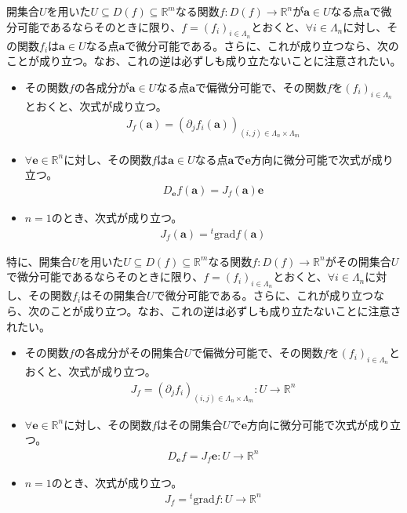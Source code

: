 \documentclass[dvipdfmx]{jsarticle}
\begin{document}
\begin{thm}\label{4.2.6.4}
開集合$U$を用いた$U \subseteq D(f) \subseteq \mathbb{R}^{m}$なる関数$f:D(f) \rightarrow \mathbb{R}^{n}$が$\mathbf{a} \in U$なる点$\mathbf{a}$で微分可能であるならそのときに限り、$f = \left( f_{i} \right)_{i \in \varLambda_{n}}$とおくと、$\forall i \in \varLambda_{n}$に対し、その関数$f_{i}$は$\mathbf{a} \in U$なる点$\mathbf{a}$で微分可能である。さらに、これが成り立つなら、次のことが成り立つ。なお、これの逆は必ずしも成り立たないことに注意されたい。
\begin{itemize}
\item
  その関数$f$の各成分が$\mathbf{a} \in U$なる点$\mathbf{a}$で偏微分可能で、その関数$f$を$\left( f_{i} \right)_{i \in \varLambda_{n}}$とおくと、次式が成り立つ。
\begin{align*}
J_{f}\left( \mathbf{a} \right) = \left( \partial_{j}f_{i}\left( \mathbf{a} \right) \right)_{(i,j) \in \varLambda_{n} \times \varLambda_{m}}
\end{align*}
\item
  $\forall\mathbf{e} \in \mathbb{R}^{n}$に対し、その関数$f$は$\mathbf{a} \in U$なる点$\mathbf{a}$で$\mathbf{e}$方向に微分可能で次式が成り立つ。
\begin{align*}
D_{\mathbf{e}}f\left( \mathbf{a} \right) = J_{f}\left( \mathbf{a} \right)\mathbf{e}
\end{align*}
\item
  $n = 1$のとき、次式が成り立つ。
\begin{align*}
J_{f}\left( \mathbf{a} \right) ={}^{t}\mathrm{grad}f\left( \mathbf{a} \right)
\end{align*}
\end{itemize}\par
特に、開集合$U$を用いた$U \subseteq D(f) \subseteq \mathbb{R}^{m}$なる関数$f:D(f) \rightarrow \mathbb{R}^{n}$がその開集合$U$で微分可能であるならそのときに限り、$f = \left( f_{i} \right)_{i \in \varLambda_{n}}$とおくと、$\forall i \in \varLambda_{n}$に対し、その関数$f_{i}$はその開集合$U$で微分可能である。さらに、これが成り立つなら、次のことが成り立つ。なお、これの逆は必ずしも成り立たないことに注意されたい。
\begin{itemize}
\item
  その関数$f$の各成分がその開集合$U$で偏微分可能で、その関数$f$を$\left( f_{i} \right)_{i \in \varLambda_{n}}$とおくと、次式が成り立つ。
\begin{align*}
J_{f} = \left( \partial_{j}f_{i} \right)_{(i,j) \in \varLambda_{n} \times \varLambda_{m}}:U \rightarrow \mathbb{R}^{n}
\end{align*}
\item
  $\forall\mathbf{e} \in \mathbb{R}^{n}$に対し、その関数$f$はその開集合$U$で$\mathbf{e}$方向に微分可能で次式が成り立つ。
\begin{align*}
D_{\mathbf{e}}f = J_{f}\mathbf{e}:U \rightarrow \mathbb{R}^{n}
\end{align*}
\item
  $n = 1$のとき、次式が成り立つ。
\begin{align*}
J_{f} ={}^{t}\mathrm{grad}f:U \rightarrow \mathbb{R}^{n}
\end{align*}
\end{itemize}
\end{thm}
\end{document}
